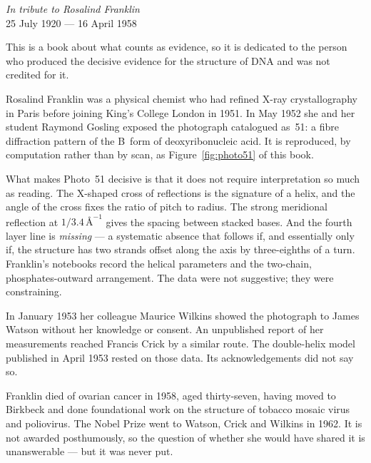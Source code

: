 \clearpage
\thispagestyle{empty}
\vspace*{\fill}
\begin{center}
{\large\itshape In tribute to Rosalind Franklin}\\[0.3em]
{\small 25 July 1920 --- 16 April 1958}
\end{center}
\vspace{1.2em}

\noindent
This is a book about what counts as evidence, so it is dedicated to the person
who produced the decisive evidence for the structure of DNA and was not credited
for it.

\medskip\noindent
Rosalind Franklin was a physical chemist who had refined X-ray crystallography in
Paris before joining King's College London in 1951. In May 1952 she and her
student Raymond Gosling exposed the photograph catalogued as~51: a fibre
diffraction pattern of the B~form of deoxyribonucleic acid. It is reproduced, by
computation rather than by scan, as Figure~\ref{fig:photo51} of this book.

\medskip\noindent
What makes Photo~51 decisive is that it does not require interpretation so much
as reading. The X-shaped cross of reflections is the signature of a helix, and
the angle of the cross fixes the ratio of pitch to radius. The strong meridional
reflection at $1/3.4\,\text{\AA}^{-1}$ gives the spacing between stacked bases.
And the fourth layer line is \emph{missing} --- a systematic absence that follows
if, and essentially only if, the structure has two strands offset along the axis
by three-eighths of a turn. Franklin's notebooks record the helical parameters
and the two-chain, phosphates-outward arrangement. The data were not suggestive;
they were constraining.

\medskip\noindent
In January 1953 her colleague Maurice Wilkins showed the photograph to James
Watson without her knowledge or consent. An unpublished report of her
measurements reached Francis Crick by a similar route. The double-helix model
published in April 1953 rested on those data. Its acknowledgements did not say
so.

\medskip\noindent
Franklin died of ovarian cancer in 1958, aged thirty-seven, having moved to
Birkbeck and done foundational work on the structure of tobacco mosaic virus and
poliovirus. The Nobel Prize went to Watson, Crick and Wilkins in 1962. It is not
awarded posthumously, so the question of whether she would have shared it is
unanswerable --- but it was never put.

